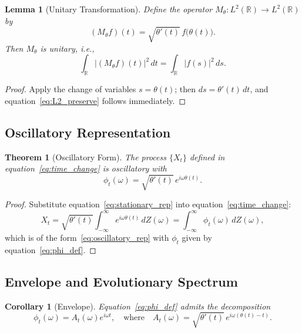 \documentclass[11pt]{article}
\newtheorem{theorem}{Theorem}
\newtheorem{lemma}{Lemma}
\newtheorem{corollary}{Corollary}
\begin{document}
\begin{lemma}[Unitary Transformation]\label{lem:unitary}
Define the operator $M_\theta\colon L^2(\mathbb{R})\to L^2(\mathbb{R})$ by
\begin{equation}\label{eq:unitary_op}
    (M_\theta f)(t) = \sqrt{\theta'(t)}\,f\bigl(\theta(t)\bigr).
\end{equation}
Then $M_\theta$ is unitary, i.e.,
\begin{equation}\label{eq:L2_preserve}
    \int_{\mathbb{R}}\lvert (M_\theta f)(t)\rvert^2\,dt
    =\int_{\mathbb{R}}\lvert f(s)\rvert^2\,ds.
\end{equation}
\end{lemma}

\begin{proof}
Apply the change of variables $s=\theta(t)$; then $ds=\theta'(t)\,dt$, and equation~\eqref{eq:L2_preserve} follows immediately.
\end{proof}

\subsection{Oscillatory Representation}

\begin{theorem}[Oscillatory Form]\label{thm:osc_rep}
The process $\{X_t\}$ defined in equation~\eqref{eq:time_change} is oscillatory with
\begin{equation}\label{eq:phi_def}
    \phi_t(\omega)=\sqrt{\theta'(t)}\,e^{i\omega\theta(t)}.
\end{equation}
\end{theorem}

\begin{proof}
Substitute equation~\eqref{eq:stationary_rep} into equation~\eqref{eq:time_change}:
\[
    X_t=\sqrt{\theta'(t)}\int_{-\infty}^{\infty}e^{i\omega\theta(t)}\,dZ(\omega)
        =\int_{-\infty}^{\infty}\phi_t(\omega)\,dZ(\omega),
\]
which is of the form~\eqref{eq:oscillatory_rep} with $\phi_t$ given by equation~\eqref{eq:phi_def}.
\end{proof}

\subsection{Envelope and Evolutionary Spectrum}

\begin{corollary}[Envelope]\label{cor:envelope}
Equation~\eqref{eq:phi_def} admits the decomposition
\begin{equation}\label{eq:envelope}
    \phi_t(\omega)=A_t(\omega)e^{i\omega t},
    \quad\text{where}\quad
    A_t(\omega)=\sqrt{\theta'(t)}\,e^{i\omega(\theta(t)-t)}.
\end{equation}
\end{corollary}
\end{document}
